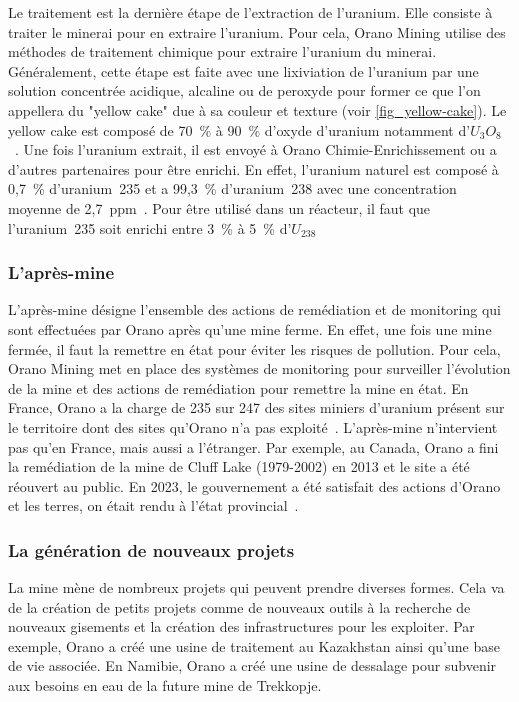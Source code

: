 Le traitement est la dernière étape de l'extraction de l'uranium. Elle consiste à traiter le minerai pour en extraire l'uranium. Pour cela, Orano Mining utilise des méthodes de traitement chimique pour extraire l'uranium du minerai. Généralement, cette étape est faite avec une lixiviation de l'uranium par une solution concentrée acidique, alcaline ou de peroxyde pour former ce que l'on appellera du "yellow cake" due à sa couleur et texture (voir \cref{fig_yellow-cake}). Le yellow cake est composé de 70~\% à 90~\% d'oxyde d'uranium notamment d'$U_3O_8$~\cite{article:composition-yellow-cake}. Une fois l'uranium extrait, il est envoyé à Orano Chimie-Enrichissement ou a d'autres partenaires pour être enrichi. En effet, l'uranium naturel est composé à 0,7~\% d'uranium~235 et a 99,3~\% d'uranium~238 avec une concentration moyenne de 2,7~ppm~\cite{site:natural_uranium}. Pour être utilisé dans un réacteur, il faut que l'uranium~235 soit enrichi entre 3~\% à 5~\% d'$U_{238}$~\cite{article:uranium-concentration}



\subsubsection{L'après-mine}
L'après-mine désigne l'ensemble des actions de remédiation et de monitoring qui sont effectuées par Orano après qu'une mine ferme. En effet, une fois une mine fermée, il faut la remettre en état pour éviter les risques de pollution. Pour cela, Orano Mining met en place des systèmes de monitoring pour surveiller l'évolution de la mine et des actions de remédiation pour remettre la mine en état. En France, Orano a la charge de 235 sur 247 des sites miniers d'uranium présent sur le territoire dont des sites qu'Orano n'a pas exploité~\cite{site:orano_apres_mine}. L'après-mine n'intervient pas qu'en France, mais aussi a l'étranger. Par exemple, au Canada, Orano a fini la remédiation de la mine de Cluff Lake (1979-2002) en 2013 et le site a été réouvert au public. En 2023, le gouvernement a été satisfait des actions d'Orano et les terres, on était rendu à l'état provincial~\cite{site:Cluff_lake_remediation}.

\subsubsection{La génération de nouveaux projets}
La mine mène de nombreux projets qui peuvent prendre diverses formes. Cela va de la création de petits projets comme de nouveaux outils à la recherche de nouveaux gisements et la création des infrastructures pour les exploiter. Par exemple, Orano a créé une usine de traitement au Kazakhstan ainsi qu'une base de vie associée. En Namibie, Orano a créé une usine de dessalage pour subvenir aux besoins en eau de la future mine de Trekkopje.

